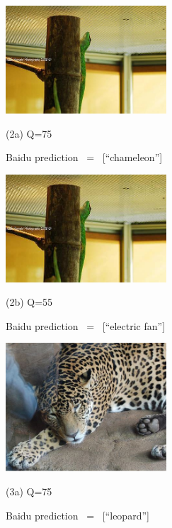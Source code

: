 \begin{figure}[htbp]
	\vfill	
	\begin{minipage}{0.5\linewidth}
		\centerline{\includegraphics[width=6.0cm, trim=0 0 0 0]{figures/chameleon_q75.jpeg}}
		\centerline{(2a) Q=75}
		\centerline{Baidu prediction \ = \ [``chameleon'']}
		\vspace{0.4cm}
	\end{minipage}
	\hfill
	\begin{minipage}{0.5\linewidth}
		\centerline{\includegraphics[width=6.0cm, trim=0 0 0 0]{figures/chameleon_q55.jpeg}}
		\centerline{(2b) Q=55}
 		\centerline{Baidu prediction \ = \ [``electric fan'']}
 		\vspace{0.4cm}
	\end{minipage}
	\vfill
	\begin{minipage}{0.5\linewidth}
		\centerline{\includegraphics[width=6.0cm, trim=0 0 0 0, clip]{figures/tiger_highq.jpeg}}
		\centerline{(3a) Q=75}
		\centerline{Baidu prediction \ = \ [``leopard'']}
		\vspace{0.3cm}
	\end{minipage}
	\hfill
	\begin{minipage}{0.5\linewidth}

\end{minipage}
\end{figure}
